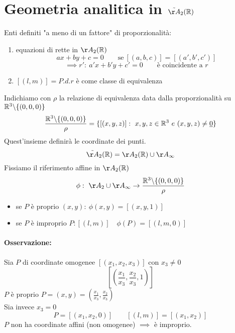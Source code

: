\documentclass{report}
\begin{document}
\section{Geometria analitica in \(\tilde{\AA}_{2}(\RR) \)}
Enti definiti "a meno di un fattore" di proporzionalità:
\begin{enumerate}
    \item equazioni di rette in \(\AA_{2}(\RR) \) \[
            ax + by + c = 0 \qquad \text{se} \ [(a,b,c)] = [(a',b', c')]
    \] \[
    \implies r' : \ a'x + b'y + c' = 0 \qquad \text{è coincidente a } r
    \] 
\item \([(l,m)] = P.d.r\) è come classe di equivalenza 
\end{enumerate}
Indichiamo con \(\rho \) la relazione di equivalenza data dalla proporzionalità su \(\RR^{3}\backslash \{(0,0,0)\} \) 
\[
    \frac{\RR^{3}\backslash \{(0,0,0)\}}{\rho} = \{[(x,y,z)] : \ x,y,z \in \RR^{3} \ e \ (x,y,z) \neq \ul{0} \} 
\] 
Quest'insieme definirà le coordinate dei punti.
\[
\tilde\AA_{2}(\RR) = \AA_{2}(\RR) \cup \AA_{\infty}
\] Fissiamo il riferimento affine in \(\AA_{2}(\RR) \) \[
\phi: \ \AA_2 \cup \AA_{\infty} \to \frac{\RR^{3}\backslash \{(0,0,0)\}}{\rho} 
\] 
\begin{itemize}
    \item se \(P\) è proprio \((x,y) : \ \phi(x, y) = [(x,y,1)]\)
    \item se \(P\) è improprio \(P: [(l,m)] \quad \phi (P) = [(l,m,0)]\)
\end{itemize}


\paragraph{Osservazione:} Sia \(P\) di coordinate omogenee \([(x_1,x_2,x_3)]\) con \(x_3\neq 0\) \[
    \left[ \left( \frac{x_1}{x_3}, \frac{x_2}{x_3}, 1 \right)  \right] 
\] \(P\) è proprio \(P = (x,y) = (\frac{x_1}{x_3}, \frac{x_2}{x_3})\) \\
Sia invece \(x_3= 0\) 
\[
    P = [(x_1,x_2, 0 )] \qquad [(l,m)] = [(x_1,x_2)]
\] \(P\) non ha coordinate affini (non omogenee) \(\implies \) è improprio.
\end{document}

